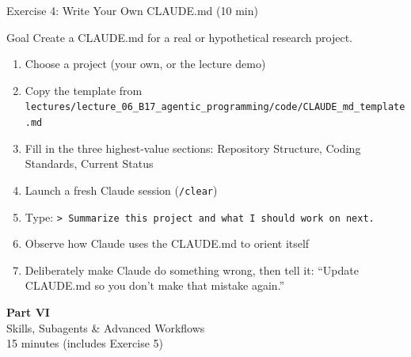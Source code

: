 \documentclass[aspectratio=169,10pt]{beamer}
\newcommand{\emphc}[1]{\textcolor{harvardcrimson}{#1}}
\begin{document}
\begin{frame}[fragile]{Exercise 4: Write Your Own CLAUDE.md {\small(10 min)}}
\begin{exampleblock}{Goal}
Create a CLAUDE.md for a real or hypothetical research project.
\end{exampleblock}

\begin{enumerate}\itemsep2pt
    \item Choose a project (your own, or the lecture demo)
    \item Copy the template from \texttt{lectures/lecture\_06\_B17\_agentic\_programming/code/CLAUDE\_md\_template.md}
    \item Fill in the \emphc{three highest-value sections}: Repository Structure, Coding Standards, Current Status
    \item Launch a fresh Claude session (\texttt{/clear})
    \item Type: \texttt{> Summarize this project and what I should work on next.}
    \item Observe how Claude uses the CLAUDE.md to orient itself
    \item Deliberately make Claude do something wrong, then tell it: ``Update CLAUDE.md so you don't make that mistake again.''
\end{enumerate}
\end{frame}


\begin{frame}{}
\vfill
\begin{center}
{\Huge \textcolor{uzhblue}{\textbf{Part VI}}}\\[12pt]
{\LARGE Skills, Subagents \& Advanced Workflows}\\[6pt]
{\small 15 minutes (includes Exercise 5)}
\end{center}
\vfill
\end{frame}
\end{document}
